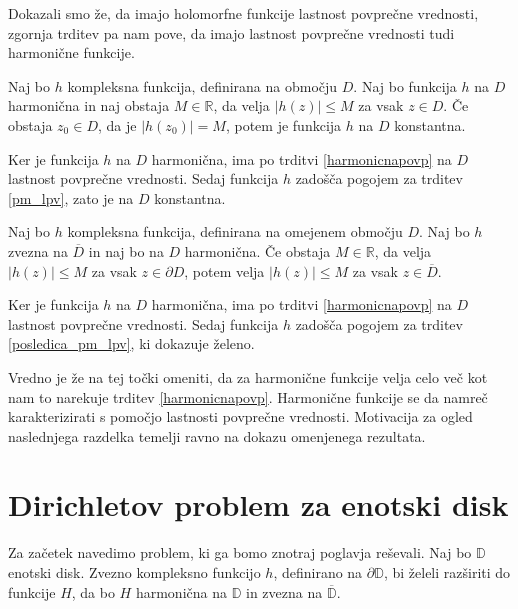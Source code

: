 \documentclass[mat1]{fmfdelo}
\begin{document}
    \begin{opomba}
        Dokazali smo že, da imajo holomorfne funkcije lastnost povprečne vrednosti, zgornja trditev pa nam pove, da imajo lastnost povprečne vrednosti tudi harmonične funkcije. 
    \end{opomba}

    \begin{posledica}
        \label{pm_harm}
        Naj bo $h$ kompleksna funkcija, definirana na območju $D$. Naj bo funkcija $h$ na $D$ harmonična in naj obstaja $M \in \mathbb{R}$, da velja $|h(z)| \leq M$ za vsak $z \in D$. 
        Če obstaja $z_0 \in D$, da je $|h(z_0)| = M$, potem je funkcija $h$ na $D$ konstantna.  
    \end{posledica}
    \begin{dokaz}
        Ker je funkcija $h$ na $D$ harmonična, ima po trditvi \ref{harmonicnapovp} na $D$ lastnost povprečne vrednosti. Sedaj funkcija $h$ zadošča pogojem za trditev \ref{pm_lpv}, zato je na $D$ konstantna.
    \end{dokaz}

    \begin{posledica}
        Naj bo $h$ kompleksna funkcija, definirana na omejenem območju $D$. Naj bo $h$ zvezna na $\overline{D}$ in naj bo na $D$ harmonična. 
        Če obstaja $M \in \mathbb{R}$, da velja $|h(z)| \leq M$ za vsak $z \in \partial D$, potem velja $|h(z)| \leq M$ za vsak $z \in \overline{D}$. 
    \end{posledica}
    \begin{dokaz}
        Ker je funkcija $h$ na $D$ harmonična, ima po trditvi \ref{harmonicnapovp} na $D$ lastnost povprečne vrednosti. Sedaj funkcija $h$ zadošča pogojem za trditev \ref{posledica_pm_lpv}, ki dokazuje želeno.
    \end{dokaz}

    \begin{opomba}
        \label{motivacija}
        Vredno je že na tej točki omeniti, da za harmonične funkcije velja celo več kot nam to narekuje trditev \ref{harmonicnapovp}. Harmonične funkcije se da namreč karakterizirati s pomočjo lastnosti povprečne vrednosti. Motivacija za ogled naslednjega razdelka temelji ravno na dokazu omenjenega rezultata.  
    \end{opomba}

\section{Dirichletov problem za enotski disk}
    Za začetek navedimo problem, ki ga bomo znotraj poglavja reševali.
    Naj bo $\mathbb{D}$ enotski disk. Zvezno kompleksno funkcijo $h$, definirano na $\partial \mathbb{D}$, bi želeli razširiti do funkcije $H$, da bo $H$ harmonična na $\mathbb{D}$ in zvezna na $\overline{\mathbb{D}}$.
\end{document}
